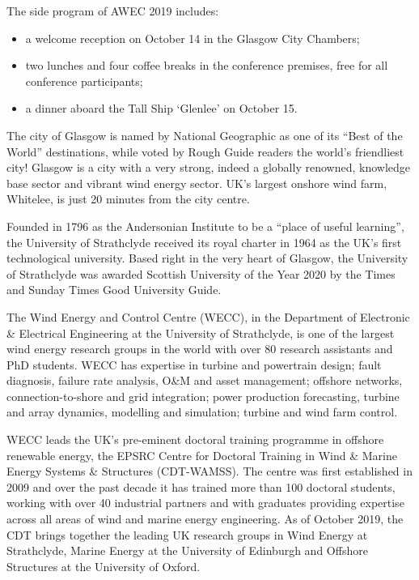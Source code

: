 \begin{multicols}{2}


The side program of AWEC 2019 includes:
\begin{itemize}
\item a welcome reception on October 14 in the Glasgow City Chambers;

\item two lunches and four coffee breaks in the conference premises, free for all conference participants;

\item a dinner aboard the Tall Ship `Glenlee' on October 15.
\end{itemize}

The city of Glasgow is named by National Geographic as one of its ``Best of the World'' destinations, while voted by Rough Guide readers the world’s friendliest city! Glasgow is a city with a very strong, indeed a globally renowned, knowledge base sector and vibrant wind energy sector. UK’s largest onshore wind farm, Whitelee, is just 20 minutes from the city centre.

Founded in 1796 as the Andersonian Institute to be a ``place of useful learning'', the University of Strathclyde received its royal charter in 1964 as the UK’s first technological university. Based right in the very heart of Glasgow, the University of Strathclyde was awarded Scottish University of the Year 2020 by the Times and Sunday Times Good University Guide.

The Wind Energy and Control Centre (WECC), in the Department of Electronic \& Electrical Engineering at the University of Strathclyde, is one of the largest wind energy research groups in the world with over 80 research assistants and PhD students. WECC has expertise in turbine and powertrain design; fault diagnosis, failure rate analysis, O\&M and asset management; offshore networks, connection-to-shore and grid integration; power production forecasting, turbine and array dynamics, modelling and simulation; turbine and wind farm control.

WECC leads the UK’s pre-eminent doctoral training programme in offshore renewable energy, the EPSRC Centre for Doctoral Training in Wind \& Marine Energy Systems \& Structures (CDT-WAMSS). The centre was first established in 2009 and over the past decade it has trained more than 100 doctoral students, working with over 40 industrial partners and with graduates providing expertise across all areas of wind and marine energy engineering. As of October 2019, the CDT brings together the leading UK research groups in Wind Energy at Strathclyde, Marine Energy at the University of Edinburgh and Offshore Structures at the University of Oxford.

\end{multicols}
\clearpage

